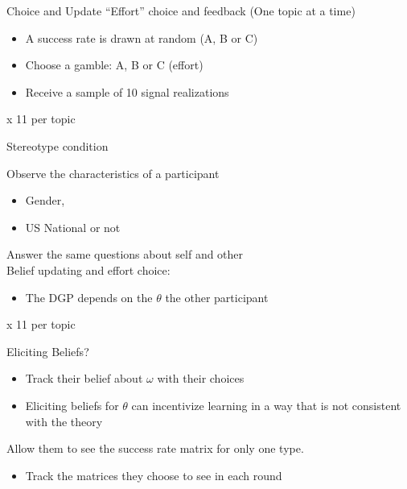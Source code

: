 \documentclass[aspectratio=169]{beamer}
\begin{document}
\begin{frame}{Choice and Update}
    ``Effort'' choice and feedback (One topic at a time)\\
    \bigskip
    \begin{itemize}
        \item A success rate is drawn at random (A, B or C)
        \item Choose a gamble: A, B or C (effort)
        \item Receive a sample of 10 signal realizations
    \end{itemize}
    \bigskip
    x 11 per topic

\end{frame}

\begin{frame}{Stereotype condition}

    Observe the characteristics of a participant \\
    \begin{itemize}
        \item Gender, 
        \item US National or not \\
    \end{itemize}
    \bigskip
    Answer the same questions about self and other\\

    \bigskip
    Belief updating and effort choice:\\
    \begin{itemize}
        \item  The DGP depends on the $\theta$ the other participant
    \end{itemize}
    \bigskip
    x 11 per topic

\end{frame}

\begin{frame}{Eliciting Beliefs?}
    \begin{itemize}

        \item Track their belief about $\omega$ with their choices\\
        \bigskip
        \item Eliciting beliefs for $\theta$ can incentivize learning in a way that is not consistent with the theory\\
        \bigskip
        
    \end{itemize}

    Allow them to see the success rate matrix for only one type. 
    \begin{itemize}
        \item Track the matrices they choose to see in each round
    \end{itemize}

\end{frame}
\end{document}
